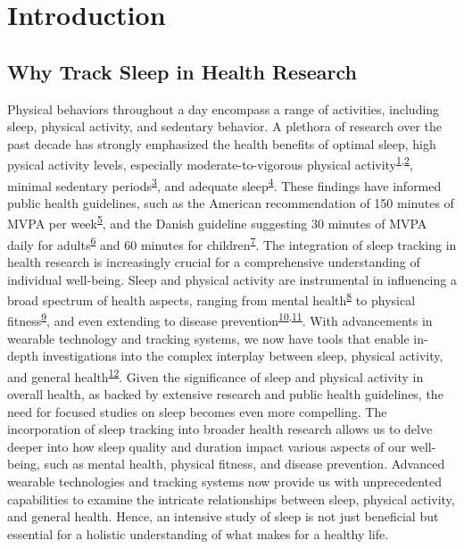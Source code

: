 \documentclass[
  10pt,
]{scrbook}
\begin{document}
\hypertarget{introduction}{%
\chapter{Introduction}\label{introduction}}

\hypertarget{why-track-sleep-in-health-research}{%
\section{Why Track Sleep in Health
Research}\label{why-track-sleep-in-health-research}}

Physical behaviors throughout a day encompass a range of activities,
including sleep, physical activity, and sedentary behavior. A plethora
of research over the past decade has strongly emphasized the health
benefits of optimal sleep, high pysical activity levels, especially
moderate-to-vigorous physical
activity\textsuperscript{\protect\hyperlink{ref-kraus_physical_2019}{1},\protect\hyperlink{ref-lee_effect_2012}{2}},
minimal sedentary
periods\textsuperscript{\protect\hyperlink{ref-wilmot_sedentary_2012}{3}},
and adequate
sleep\textsuperscript{\protect\hyperlink{ref-cappuccio_sleep_2010}{4}}.
These findings have informed public health guidelines, such as the
American recommendation of 150 minutes of MVPA per
week\textsuperscript{\protect\hyperlink{ref-kl_physical_2018}{5}}, and
the Danish guideline suggesting 30 minutes of MVPA daily for
adults\textsuperscript{\protect\hyperlink{ref-el-zine_fysisk_nodate-1}{6}}
and 60 minutes for
children\textsuperscript{\protect\hyperlink{ref-el-zine_fysisk_nodate}{7}}.
The integration of sleep tracking in health research is increasingly
crucial for a comprehensive understanding of individual well-being.
Sleep and physical activity are instrumental in influencing a broad
spectrum of health aspects, ranging from mental
health\textsuperscript{\protect\hyperlink{ref-biddle_physical_2011}{8}}
to physical
fitness\textsuperscript{\protect\hyperlink{ref-warburton_health_2017}{9}},
and even extending to disease
prevention\textsuperscript{\protect\hyperlink{ref-strath_guide_2013}{10},\protect\hyperlink{ref-arem_leisure_2015}{11}}.
With advancements in wearable technology and tracking systems, we now
have tools that enable in-depth investigations into the complex
interplay between sleep, physical activity, and general
health\textsuperscript{\protect\hyperlink{ref-rollo_whole_2020}{12}}.
Given the significance of sleep and physical activity in overall health,
as backed by extensive research and public health guidelines, the need
for focused studies on sleep becomes even more compelling. The
incorporation of sleep tracking into broader health research allows us
to delve deeper into how sleep quality and duration impact various
aspects of our well-being, such as mental health, physical fitness, and
disease prevention. Advanced wearable technologies and tracking systems
now provide us with unprecedented capabilities to examine the intricate
relationships between sleep, physical activity, and general health.
Hence, an intensive study of sleep is not just beneficial but essential
for a holistic understanding of what makes for a healthy life.
\end{document}
